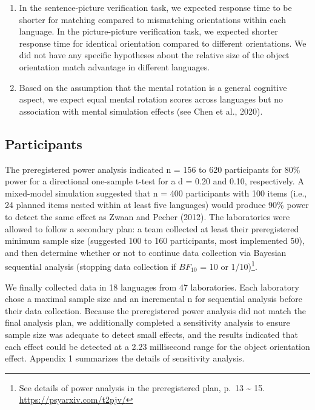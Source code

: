 \documentclass[
  man]{apa7}
\begin{document}
\begin{enumerate}
\def\labelenumi{(\arabic{enumi})}
\item
  In the sentence-picture verification task, we expected response time to be shorter for matching compared to mismatching orientations within each language. In the picture-picture verification task, we expected shorter response time for identical orientation compared to different orientations. We did not have any specific hypotheses about the relative size of the object orientation match advantage in different languages.
\item
  Based on the assumption that the mental rotation is a general cognitive aspect, we expect equal mental rotation scores across languages but no association with mental simulation effects (see Chen et al., 2020).
\end{enumerate}

\hypertarget{participants}{%
\subsection{Participants}\label{participants}}

The preregistered power analysis indicated n = 156 to 620 participants for 80\% power for a directional one-sample t-test for a d = 0.20 and 0.10, respectively. A mixed-model simulation suggested that n = 400 participants with 100 items (i.e., 24 planned items nested within at least five languages) would produce 90\% power to detect the same effect as Zwaan and Pecher (2012). The laboratories were allowed to follow a secondary plan: a team collected at least their preregistered minimum sample size (suggested 100 to 160 participants, most implemented 50), and then determine whether or not to continue data collection via Bayesian sequential analysis (stopping data collection if \(BF_{10}\) = 10 or 1/10)\footnote{See details of power analysis in the preregistered plan, p.~13 \textasciitilde{} 15. \url{https://psyarxiv.com/t2pjv/}}.

We finally collected data in 18 languages from 47 laboratories. Each laboratory chose a maximal sample size and an incremental n for sequential analysis before their data collection. Because the preregistered power analysis did not match the final analysis plan, we additionally completed a sensitivity analysis to ensure sample size was adequate to detect small effects, and the results indicated that each effect could be detected at a 2.23 millisecond range for the object orientation effect. Appendix 1 summarizes the details of sensitivity analysis.
\end{document}
